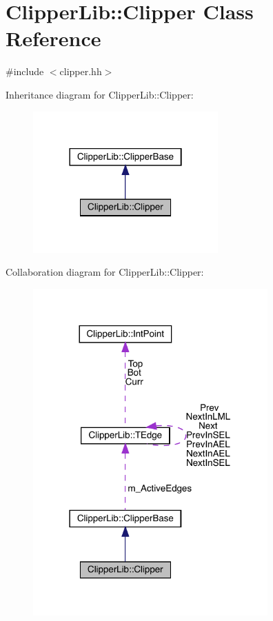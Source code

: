 \hypertarget{class_clipper_lib_1_1_clipper}{}\section{Clipper\+Lib\+::Clipper Class Reference}
\label{class_clipper_lib_1_1_clipper}


{\ttfamily \#include $<$clipper.\+hh$>$}



Inheritance diagram for Clipper\+Lib\+::Clipper\+:
\nopagebreak
\begin{figure}[H]
\begin{center}
\leavevmode
\includegraphics[width=201pt]{class_clipper_lib_1_1_clipper__inherit__graph}
\end{center}
\end{figure}


Collaboration diagram for Clipper\+Lib\+::Clipper\+:
\nopagebreak
\begin{figure}[H]
\begin{center}
\leavevmode
\includegraphics[width=255pt]{class_clipper_lib_1_1_clipper__coll__graph}
\end{center}
\end{figure}
